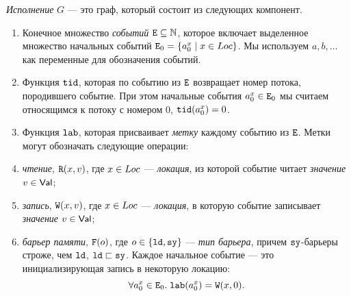 

\begin{definition}
\label{def:execution}
\emph{Исполнение} $G$ --- это граф, который состоит из следующих компонент.
\begin{enumerate}
\item Конечное множество \emph{событий} $\lE \suq \mathbb{N}$, которое включает
      выделенное множество начальных событий $\lE_0 = \{ a^x_0 \suchthat x \in \Loc \}$.
      Мы используем $a,b,\ldots$ как переменные для обозначения событий.

\item Функция $\lTID$, которая по событию из $\lE$  возвращает номер потока, породившего событие.
      При этом начальные события $a^x_0 \in \lE_0$ мы считаем относящимся к потоку с номером 0,
      $\lTID(a^x_0) = 0$.

\item Функция $\lLAB$, которая присваивает \emph{метку} каждому событию из $\lE$.
      Метки могут обозначать следующие операции:
\squishlist
\item \emph{чтение}, $\evlab{\lR}{o}{x}{v}$, где $x\in\Loc$ ---
  \emph{локация}, из которой событие читает \emph{значение} $v\in\Val$;
\item \emph{запись}, $\evlab{\lW}{o}{x}{v}$, где $x\in\Loc$ ---
  \emph{локация}, в которую событие записывает \emph{значение} $v\in\Val$;
\item \emph{барьер памяти}, $\flab{o}$, где $o\in \{\ld,\full\}$ --- \emph{тип барьера}, причем $\full$-барьеры строже, чем
  $\ld$, $\ld \sqsu \full$.
\squishend
Каждое начальное событие --- это инициализирующая запись в некоторую локацию:
\[\forall a^x_0 \in \lE_0. \; \lLAB(a^x_0) = \evlab{\lW}{\pln}{x}{0}.\]


\end{enumerate}
\end{definition}
